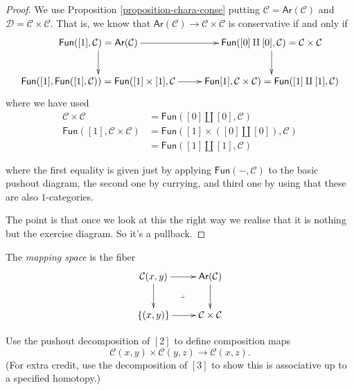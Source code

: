 \begin{proof}
We use Proposition
\ref{proposition-chara-conse}
putting
$\mathcal{C}=\mathsf{Ar}(\mathcal{C})$
and
$\mathcal{D}=\mathcal{C} \times \mathcal{C}$.
That is, we know that
$\mathsf{Ar}(\mathcal{C}) \to \mathcal{C}
\times \mathcal{C}$
is conservative if and only if
$$
\xymatrix{
\mathsf{Fun}([1],\mathcal{C})=\mathsf{Ar}
(\mathcal{C})\ar[r]\ar[d]&
\mathsf{Fun}([0]\amalg
[0],\mathcal{C})=\mathcal{C}\times\mathcal{C}
\ar[d]\\
\mathsf{Fun}([1],\mathsf{Fun}([1],\mathcal{C}
))
=\mathsf{Fun}([1]\times[1],\mathcal{C}\ar[r]&
\mathsf{Fun}[1],\mathcal{C}
\times\mathcal{C})
=\mathsf{Fun}([1]\amalg[1],\mathcal{C})
}
$$
where we have used
$$
\begin{aligned}
\mathcal{C}\times\mathcal{C}&=\mathsf{Fun}
([0]\amalg[0],\mathcal{C})\\
\mathsf{Fun}([1],\mathcal{C}\times\mathcal{C}
)
&=\mathsf{Fun}([1]\times([0]\amalg[0]),
\mathcal{C})\\
&=\mathsf{Fun}([1]\amalg[1],\mathcal{C})
\end{aligned}
$$

\noindent
where the first equality is given
just by applying
$\mathsf{Fun}(-,\mathcal{C})$
to the basic pushout diagram,
the second one by currying,
and third one by
using that these are also $1$-categories.

The point is that once
we look at this the right way
we realise that it is nothing but
the exercise diagram. So it's a pullback.
\end{proof}

\begin{definition}
\label{definition-mapping-space}
The {\it mapping space} is the fiber
$$
\xymatrix{
\mathcal{C}(x,y)\ar[r]\ar[d]\ar@{}[dr]|-
{\lrcorner}
&\mathsf{Ar}(\mathcal{C})\ar[d]\\
\{(x,y)\}\ar[r]&\mathcal{C}\times\mathcal{C}
}
$$
\end{definition}

\begin{exercise}
\label{exercise-compositions}
Use the pushout decomposition of $[2]$
to define composition maps
$$
\mathcal{C}(x,y)\times\mathcal{C}(y,z)
\to\mathcal{C}(x,z).
$$
(For extra credit, use the decomposition
of $[3]$ to show this is associative
up to a specified homotopy.)
\end{exercise}

